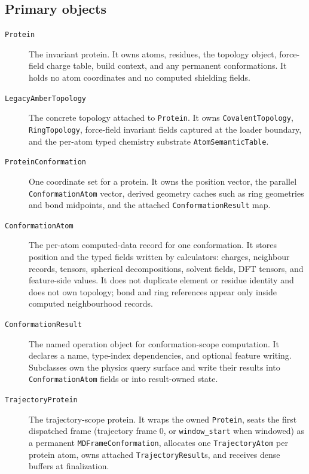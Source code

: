 \documentclass[11pt]{article}
\newcommand{\code}[1]{\texttt{#1}}
\begin{document}
\subsection{Primary objects}

\begin{description}
\item[\code{Protein}] The invariant protein. It owns atoms, residues,
the topology object, force-field charge table, build context, and any permanent
conformations. It holds no atom coordinates and no computed shielding fields.

\item[\code{LegacyAmberTopology}] The concrete topology attached to
\code{Protein}. It owns \code{CovalentTopology}, \code{RingTopology},
force-field invariant fields captured at the loader boundary, and the
per-atom typed chemistry substrate \code{AtomSemanticTable}.

\item[\code{ProteinConformation}] One coordinate set for a protein. It owns
the position vector, the parallel \code{ConformationAtom} vector, derived
geometry caches such as ring geometries and bond midpoints, and the attached
\code{ConformationResult} map.

\item[\code{ConformationAtom}] The per-atom computed-data record for one
conformation. It stores position and the typed fields written by calculators:
charges, neighbour records, tensors, spherical decompositions, solvent fields,
DFT tensors, and feature-side values. It does not duplicate element or residue
identity and does not own topology; bond and ring references appear only inside
computed neighbourhood records.

\item[\code{ConformationResult}] The named operation object for
conformation-scope computation. It declares a name, type-index dependencies,
and optional feature writing. Subclasses own the physics query surface and write
their results into \code{ConformationAtom} fields or into result-owned state.

\item[\code{TrajectoryProtein}] The trajectory-scope protein. It wraps the
owned \code{Protein}, seats the first dispatched frame (trajectory frame 0, or
\code{window\_start} when windowed) as a permanent
\code{MDFrameConformation}, allocates one \code{TrajectoryAtom} per protein
atom, owns attached \code{TrajectoryResult}s, and receives dense buffers at
finalization.


\end{description}
\end{document}
